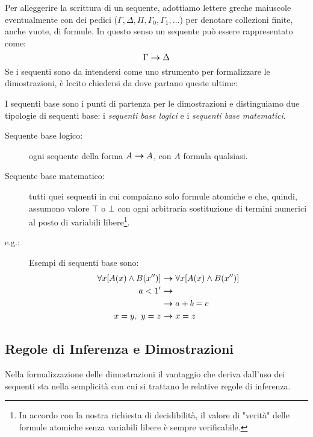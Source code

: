 		Per alleggerire la scrittura di un sequente, adottiamo lettere greche maiuscole eventualmente con dei pedici ($\Gamma, \Delta, \Pi, \Gamma_{0}, \Gamma_{1}, \ldots$) per denotare collezioni finite, anche vuote, di formule. In questo senso un sequente può essere rappresentato come:
	\begin{equation}
		\Gamma \bm{\rightarrow} \Delta \nonumber
	\end{equation}
		Se i sequenti sono da intendersi come uno strumento per formalizzare le dimostrazioni, è lecito chiedersi da dove partano queste ultime: 
	\begin{defin}
		I sequenti base sono i punti di partenza per le dimostrazioni e distinguiamo due tipologie di sequenti base: i \emph{sequenti base logici} e i \emph{sequenti base matematici}. 
		\begin{description}
			\item[Sequente base logico:] ogni sequente della forma $A \bm{\rightarrow} A$, con $A$ formula qualsiasi.
			\item[Sequente base matematico:] tutti quei sequenti in cui compaiano solo formule atomiche e che, quindi, assumono valore $\top$ o $\bot$ con ogni arbitraria sostituzione di termini numerici al posto di variabili libere\footnote{In accordo con la nostra richiesta di decidibilità, il valore di "verità" delle formule atomiche senza variabili libere è sempre verificabile.}.
	\end{description}
	\end{defin}
	\begin{description}
		\item[e.g.:] Esempi di sequenti base sono:
		\begin{align*}
			\forall x[A(x)\land B(x'')] &\bm{\rightarrow} \forall x[A(x)\land B(x'')] \\ 
			a<1' &\bm{\rightarrow} \\
			&\bm{\rightarrow} a+b=c \\
			x=y,\ y=z &\bm{\rightarrow} x=z \\
		\end{align*}
	\end{description}

\subsection{Regole di Inferenza e Dimostrazioni} %

		Nella formalizzazione delle dimostrazioni il vantaggio che deriva dall'uso dei sequenti sta nella semplicità con cui si trattano le relative regole di inferenza.
				
